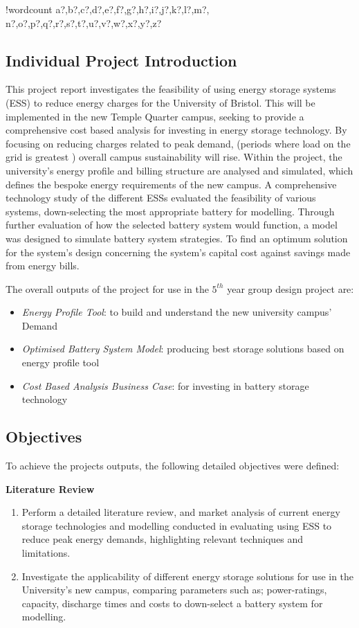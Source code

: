 \documentclass[fontsize=9.5pt]{extarticle}
\numberwithin{figure}{section} %
\providecommand{\tightlist}{%
  \setlength{\itemsep}{0pt}\setlength{\parskip}{0pt}}
\newcounter{words}
\newenvironment{counted}{%
  \setcounter{words}{0}
  \SearchList!{wordcount}{\stepcounter{words}}
    {a?,b?,c?,d?,e?,f?,g?,h?,i?,j?,k?,l?,m?,
    n?,o?,p?,q?,r?,s?,t?,u?,v?,w?,x?,y?,z?}
  \UndoBoundary{'}
  \SearchOrder{p;}}{%
  \StopSearching}
\begin{document}
\begin{counted}
\subsection{Individual Project
Introduction}\label{individual-project-introduction}

This project report investigates the feasibility of using energy storage
systems (ESS) to reduce energy charges for the University of Bristol.
This will be implemented in the new Temple Quarter campus, seeking to
provide a comprehensive cost based analysis for investing in energy
storage technology. By focusing on reducing charges related to peak
demand, (periods where load on the grid is greatest
\cite{WhatisPe67:online}) overall campus sustainability will rise.
Within the project, the university's energy profile and billing
structure are analysed and simulated, which defines the bespoke energy
requirements of the new campus. A comprehensive technology study of the
different ESSs evaluated the feasibility of various systems,
down-selecting the most appropriate battery for modelling. Through
further evaluation of how the selected battery system would function, a
model was designed to simulate battery system strategies. To find an
optimum solution for the system's design concerning the system's capital
cost against savings made from energy bills.

The overall outputs of the project for use in the \(5^{th}\) year group
design project are:

\begin{itemize}
\tightlist
\item
  \emph{Energy Profile Tool}: to build and understand the new university
  campus' Demand
\item
  \emph{Optimised Battery System Model}: producing best storage
  solutions based on energy profile tool
\item
  \emph{Cost Based Analysis Business Case}: for investing in battery
  storage technology
\end{itemize}

\subsection{Objectives}\label{objectives}

To achieve the projects outputs, the following detailed objectives were
defined:

\textbf{Literature Review}

\begin{enumerate}
\item Perform a detailed literature review, and market analysis of current energy storage technologies and modelling conducted in evaluating using ESS to reduce peak energy demands, highlighting relevant techniques and limitations.
\item Investigate the applicability of different energy storage solutions for use in the University's new campus, comparing parameters such as; power-ratings, capacity, discharge times and costs to down-select a battery system for modelling.
\end{enumerate}


\end{counted}
\end{document}
